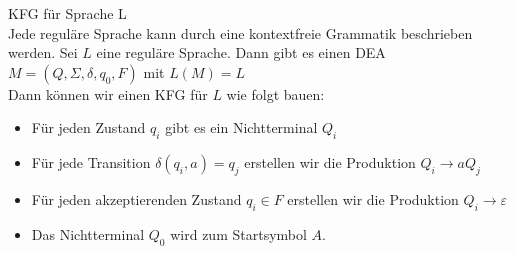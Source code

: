 \begin{KR}{KFG für Sprache L}\\
    Jede reguläre Sprache kann durch eine kontextfreie Grammatik beschrieben werden. Sei $L$ eine reguläre Sprache. Dann gibt es einen DEA $M=\left(Q, \Sigma, \delta, q_{0}, F\right)$ mit $L(M)=L$\\
    Dann können wir einen KFG für $L$ wie folgt bauen:
    \begin{itemize}
    \item Für jeden Zustand $q_{i}$ gibt es ein Nichtterminal $Q_{i}$
    \item Für jede Transition $\delta\left(q_{i}, a\right)=q_{j}$ erstellen wir die Produktion $Q_{i} \rightarrow a Q_{j}$
    \item Für jeden akzeptierenden Zustand $q_{i} \in F$ erstellen wir die Produktion $Q_{i} \rightarrow \varepsilon$
    \item Das Nichtterminal $Q_{0}$ wird zum Startsymbol $A$.
    \end{itemize}
\end{KR}